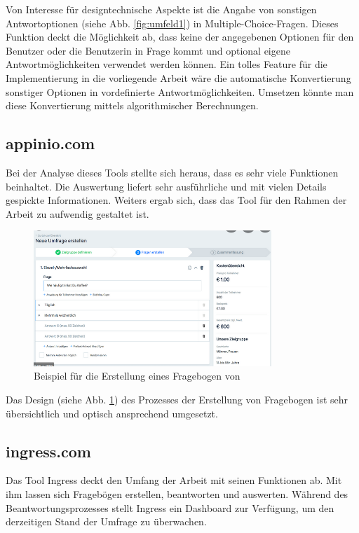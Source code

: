 Von Interesse für designtechnische Aspekte ist die Angabe von sonstigen Antwortoptionen (siehe Abb. \ref{fig:umfeld1})
in Multiple-Choice-Fragen. Dieses Funktion deckt die Möglichkeit ab, dass keine der angegebenen Optionen für den 
Benutzer oder die Benutzerin in Frage kommt und optional eigene Antwortmöglichkeiten verwendet werden können. 
\newline
Ein tolles Feature für die Implementierung in die vorliegende Arbeit wäre die automatische Konvertierung 
sonstiger Optionen in vordefinierte Antwortmöglichkeiten. Umsetzen könnte man diese Konvertierung mittels algorithmischer Berechnungen.

\subsection{appinio.com}
Bei der Analyse dieses Tools stellte sich heraus, dass es sehr viele Funktionen beinhaltet. Die Auswertung liefert 
sehr ausführliche und mit vielen Details gespickte Informationen. Weiters ergab sich, dass das Tool für den Rahmen 
der Arbeit zu aufwendig gestaltet ist.

\begin{figure}[H]
    \includegraphics[width=0.8\textwidth]{pics/Appino_SteppsBeiErstellen.PNG}
    \centering
    \caption{Beispiel für die Erstellung eines Fragebogen von \cite{noauthor_fragebogen_nodate-3} }
    \label{fig:umfeld2}
\end{figure}

Das Design (siehe Abb. \ref{fig:umfeld2}) des Prozesses der Erstellung von Fragebogen ist sehr übersichtlich und optisch 
ansprechend umgesetzt. \cite{noauthor_fragebogen_nodate-3}

\subsection{ingress.com}
Das Tool Ingress deckt den Umfang der Arbeit mit seinen Funktionen ab. Mit ihm lassen sich Fragebögen erstellen, beantworten und auswerten. 
Während des Beantwortungsprozesses stellt Ingress ein Dashboard zur Verfügung, um den derzeitigen Stand der Umfrage zu überwachen.

